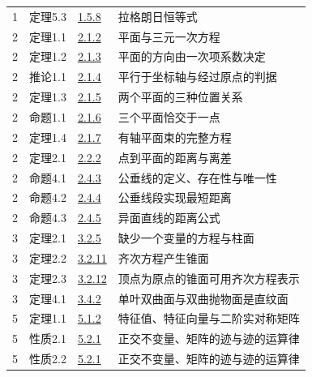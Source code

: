 \documentclass[11pt,a4paper]{article}
\begin{document}
\begin{longtable}{@{}cllp{65mm}@{}}
1&定理5.3&\hyperref[entry:1.5.8]{1.5.8}&拉格朗日恒等式\\

2&定理1.1&\hyperref[entry:2.1.2]{2.1.2}&平面与三元一次方程\\

2&定理1.2&\hyperref[entry:2.1.3]{2.1.3}&平面的方向由一次项系数决定\\

2&推论1.1&\hyperref[entry:2.1.4]{2.1.4}&平行于坐标轴与经过原点的判据\\

2&定理1.3&\hyperref[entry:2.1.5]{2.1.5}&两个平面的三种位置关系\\

2&命题1.1&\hyperref[entry:2.1.6]{2.1.6}&三个平面恰交于一点\\

2&定理1.4&\hyperref[entry:2.1.7]{2.1.7}&有轴平面束的完整方程\\

2&定理2.1&\hyperref[entry:2.2.2]{2.2.2}&点到平面的距离与离差\\

2&命题4.1&\hyperref[entry:2.4.3]{2.4.3}&公垂线的定义、存在性与唯一性\\

2&命题4.2&\hyperref[entry:2.4.4]{2.4.4}&公垂线段实现最短距离\\

2&命题4.3&\hyperref[entry:2.4.5]{2.4.5}&异面直线的距离公式\\

3&定理2.1&\hyperref[entry:3.2.5]{3.2.5}&缺少一个变量的方程与柱面\\

3&定理2.2&\hyperref[entry:3.2.11]{3.2.11}&齐次方程产生锥面\\

3&定理2.3&\hyperref[entry:3.2.12]{3.2.12}&顶点为原点的锥面可用齐次方程表示\\

3&定理4.1&\hyperref[entry:3.4.2]{3.4.2}&单叶双曲面与双曲抛物面是直纹面\\

5&定理1.1&\hyperref[entry:5.1.2]{5.1.2}&特征值、特征向量与二阶实对称矩阵\\

5&性质2.1&\hyperref[entry:5.2.1]{5.2.1}&正交不变量、矩阵的迹与迹的运算律\\

5&性质2.2&\hyperref[entry:5.2.1]{5.2.1}&正交不变量、矩阵的迹与迹的运算律\\


\end{longtable}
\end{document}
